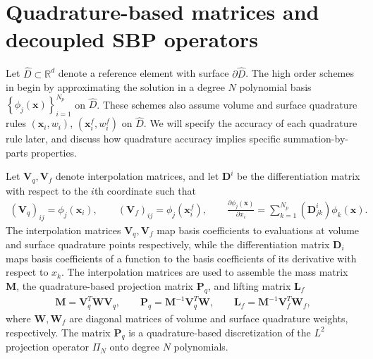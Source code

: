 \documentclass[review]{siamart0216}
\theoremstyle{assumption}
\renewcommand{\hat}[1]{\hat{#1}}
\newcommand{\pd}[2]{\frac{\partial#1}{\partial#2}}
\newcommand{\LRp}[1]{\left( #1 \right)}
\newcommand{\LRc}[1]{\left\{ #1 \right\}}
\renewcommand{\hat}{\widehat}
\newcommand{\note}[1]{{\color{blue}{#1}}}
\begin{document}



\section{Quadrature-based matrices and decoupled SBP operators}

Let $\hat{D} \subset\mathbb{R}^d$ denote a reference element with surface $\partial \hat{D}$.  
The high order schemes in \cite{chan2017discretely, chan2018discretely} begin by approximating the solution in a degree $N$ polynomial basis $\LRc{\phi_j({\bm{x}})}_{i=1}^{N_p}$ on $\hat{D}$.  These schemes also assume volume and surface quadrature rules $({\bm{x}}_i, w_i)$, $\LRp{{\bm{x}}^f_i,w^f_i}$ on $\hat{D}$.  We will specify the accuracy of each quadrature rule later, and discuss how quadrature accuracy implies specific summation-by-parts properties.  

Let $\bm{V}_q,\bm{V}_f$ denote interpolation matrices, and let $\bm{D}^i$ be the differentiation matrix with respect to the $i$th coordinate such that
\begin{gather}
\LRp{\bm{V}_q}_{ij} = \phi_j(\bm{x}_i), \qquad \LRp{\bm{V}_f}_{ij} = \phi_j(\bm{x}^f_i), \qquad \pd{\phi_j(\bm{x})}{x_i} = \sum_{k=1}^{N_p} \LRp{\bm{D}^i_{jk}} \phi_k(\bm{x}).
\end{gather}
The interpolation matrices $\bm{V}_q,\bm{V}_f$ map basis coefficients to evaluations at volume and surface quadrature points respectively, while the differentiation matrix ${\bm{D}}_i$ maps basis coefficients of a function to the basis coefficients of its derivative with respect to $x_k$.  The interpolation matrices are used to assemble the mass matrix $\bm{M}$, the quadrature-based projection matrix $\bm{P}_q$, and lifting matrix $\bm{L}_f$
\begin{gather}
\bm{M} = \bm{V}_q^T\bm{W}\bm{V}_q, \qquad \bm{P}_q = \bm{M}^{-1}\bm{V}_q^T\bm{W}, \qquad \bm{L}_f = \bm{M}^{-1}\bm{V}_f^T\bm{W}_f,
\end{gather}
where $\bm{W}, \bm{W}_f$ are diagonal matrices of volume and surface quadrature weights, respectively.  The matrix $\bm{P}_q$ is a quadrature-based discretization of the $L^2$ projection operator $\Pi_N$ onto degree $N$ polynomials.
\end{document}
